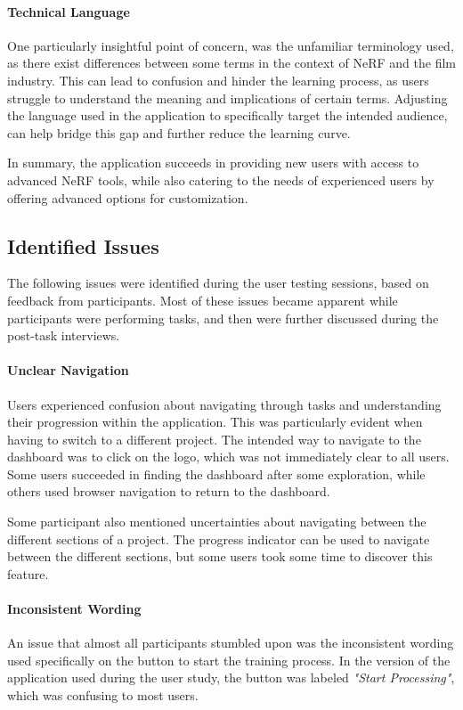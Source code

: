\paragraph{Technical Language}
One particularly insightful point of concern, was the unfamiliar terminology used, as there exist differences between some terms in the context of NeRF and the film industry.
This can lead to confusion and hinder the learning process, as users struggle to understand the meaning and implications of certain terms.
Adjusting the language used in the application to specifically target the intended audience, can help bridge this gap and further reduce the learning curve.

In summary, the application succeeds in providing new users with access to advanced NeRF tools, while also catering to the needs of experienced users by offering advanced options for customization.

\subsection*{Identified Issues}
\label{sec:results:issues}

The following issues were identified during the user testing sessions, based on feedback from participants. 
Most of these issues became apparent while participants were performing tasks, and then were further discussed during the post-task interviews.

\paragraph{Unclear Navigation}
Users experienced confusion about navigating through tasks and understanding their progression within the application.
This was particularly evident when having to switch to a different project.
The intended way to navigate to the dashboard was to click on the logo, which was not immediately clear to all users.
Some users succeeded in finding the dashboard after some exploration, while others used browser navigation to return to the dashboard.

Some participant also mentioned uncertainties about navigating between the different sections of a project.
The progress indicator can be used to navigate between the different sections, but some users took some time to discover this feature.

\paragraph{Inconsistent Wording}
An issue that almost all participants stumbled upon was the inconsistent wording used specifically on the button to start the training process.
In the version of the application used during the user study, the button was labeled \emph{"Start Processing"}, which was confusing to most users.

